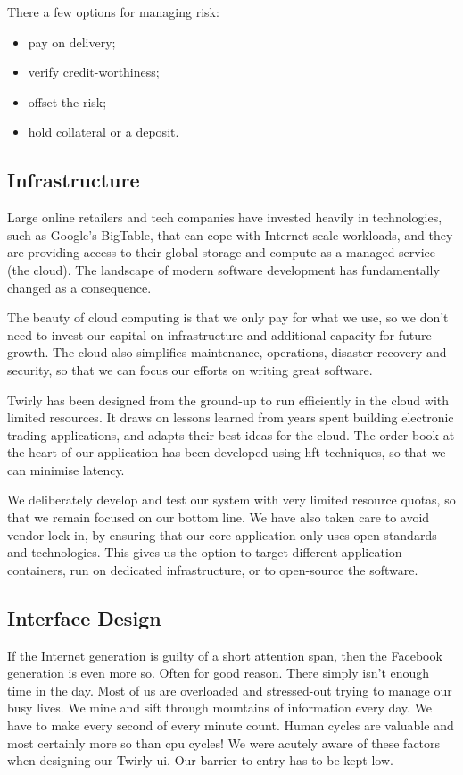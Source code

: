 \documentclass[11pt,a4paper]{article}
\newcommand{\twirly}{Twirly\cite{twirly}}
\begin{document}
There a few options for managing risk:

\begin{itemize}
\item pay on delivery;
\item verify credit-worthiness;
\item offset the risk;
\item hold collateral or a deposit.
\end{itemize}

\subsection{Infrastructure}

Large online retailers and tech companies have invested heavily in technologies, such as
Google's\cite{google} BigTable\cite{bigtable}, that can cope with Internet-scale workloads, and they
are providing access to their global storage and compute as a managed service (the \gls{cloud}). The
landscape of modern software development has fundamentally changed as a consequence.

The beauty of \gls{cloud} computing is that we only pay for what we use, so we don't need to invest
our capital on infrastructure and additional capacity for future growth. The \gls{cloud} also
simplifies maintenance, operations, disaster recovery and security, so that we can focus our efforts
on writing great software.

\twirly{} has been designed from the ground-up to run efficiently in the \gls{cloud} with limited
resources.  It draws on lessons learned from years spent building electronic trading applications,
and adapts their best ideas for the \gls{cloud}. The \gls{order-book} at the heart of our
application has been developed using \gls{hft} techniques, so that we can minimise latency.

We deliberately develop and test our system with very limited resource quotas, so that we remain
focused on our bottom line. We have also taken care to avoid vendor lock-in, by ensuring that our
core application only uses open standards and technologies. This gives us the option to target
different application containers, run on dedicated infrastructure, or to open-source the software.

\subsection{Interface Design}

If the Internet generation is guilty of a short attention span, then the Facebook\cite{facebook}
generation is even more so. Often for good reason. There simply isn't enough time in the day. Most
of us are overloaded and stressed-out trying to manage our busy lives. We mine and sift through
mountains of information every day. We have to make every second of every minute count. Human cycles
are valuable and most certainly more so than \gls{cpu} cycles! We were acutely aware of these
factors when designing our \twirly{} \gls{ui}. Our barrier to entry has to be kept low.
\end{document}
